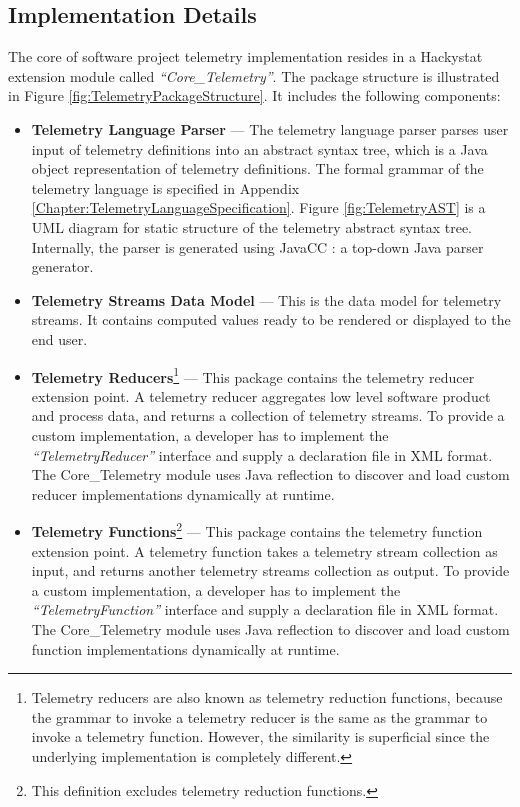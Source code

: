 \subsection{Implementation Details}

The core of software project telemetry implementation resides in a Hackystat extension module called \textit{``Core\_Telemetry''}. The package structure is illustrated in Figure \ref{fig:TelemetryPackageStructure}. It includes the following components:

\begin{itemize}
	\item \textbf{Telemetry Language Parser} --- 
The telemetry language parser parses user input of telemetry definitions into an abstract syntax tree, which is a Java object representation of telemetry definitions. The formal grammar of the telemetry language is specified in Appendix \ref{Chapter:TelemetryLanguageSpecification}. Figure \ref{fig:TelemetryAST} is a UML diagram for static structure of the telemetry abstract syntax tree. Internally, the parser is generated using JavaCC \cite{Software:JavaCC}: a top-down Java parser generator.

	\item \textbf{Telemetry Streams Data Model} ---
This is the data model for telemetry streams. It contains computed values ready to be rendered or displayed to the end user.

	\item \textbf{Telemetry Reducers}\footnote{Telemetry reducers are also known as telemetry reduction functions, because the grammar to invoke a telemetry reducer is the same as the grammar to invoke a telemetry function. However, the similarity is superficial since the underlying implementation is completely different.} ---
This package contains the telemetry reducer extension point. A telemetry reducer aggregates low level software product and process data, and returns a collection of telemetry streams. To provide a custom implementation, a developer has to implement the \textit{``TelemetryReducer''} interface and supply a declaration file in XML format. The Core\_Telemetry module uses Java reflection to discover and load custom reducer implementations dynamically at runtime. 
	
	\item \textbf{Telemetry Functions}\footnote{This definition excludes telemetry reduction functions.} ---
This package contains the telemetry function extension point. A telemetry function takes a telemetry stream collection as input, and returns another telemetry streams collection as output. To provide a custom implementation, a developer has to implement the \textit{``TelemetryFunction''} interface and supply a declaration file in XML format. The Core\_Telemetry module uses Java reflection to discover and load custom function implementations dynamically at runtime. 
	

\end{itemize}
